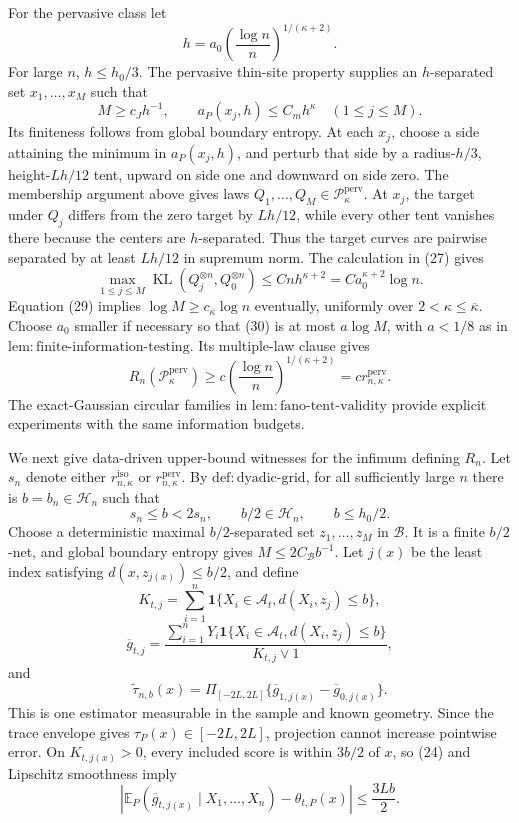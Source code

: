 For the pervasive class let
\[
 h=a_0\left(\frac{\log n}{n}\right)^{1/(\kappa+2)}.
\]
For large \(n\), \(h\le h_0/3\).  The pervasive thin-site property
supplies an \(h\)-separated set \(x_1,\ldots,x_M\) such that
\[
 M\ge c_Jh^{-1},
 \qquad a_P(x_j,h)\le C_mh^{\kappa}\quad(1\le j\le M). \tag{29}
\]
Its finiteness follows from global boundary entropy.  At each \(x_j\),
choose a side attaining the minimum in \(a_P(x_j,h)\), and perturb that
side by a radius-\(h/3\), height-\(Lh/12\) tent, upward on side one and
downward on side zero.  The membership argument above gives laws
\(Q_1,\ldots,Q_M\in\mathcal P_{\kappa}^{\mathrm{perv}}\).  At \(x_j\),
the target under \(Q_j\) differs from the zero target by \(Lh/12\), while
every other tent vanishes there because the centers are
\(h\)-separated.  Thus the target curves are pairwise separated by at
least \(Lh/12\) in supremum norm.  The calculation in (27) gives
\[
 \max_{1\le j\le M}
 \operatorname{KL}(Q_j^{\otimes n},Q_0^{\otimes n})
 \le Cnh^{\kappa+2}
 =Ca_0^{\kappa+2}\log n. \tag{30}
\]
Equation (29) implies \(\log M\ge c_{\overline\kappa}\log n\)
eventually, uniformly over \(2<\kappa\le\overline\kappa\).  Choose
\(a_0\) smaller if necessary so that (30) is at most \(a\log M\), with
\(a<1/8\) as in
\(\mathrm{lem:finite\text{-}information\text{-}testing}\).  Its
multiple-law clause gives
\[
 R_n(\mathcal P_{\kappa}^{\mathrm{perv}})
 \ge c\left(\frac{\log n}{n}\right)^{1/(\kappa+2)}
 =c r_{n,\kappa}^{\mathrm{perv}}. \tag{31}
\]
The exact-Gaussian circular families in
\(\mathrm{lem:fano\text{-}tent\text{-}validity}\) provide explicit
experiments with the same information budgets.

We next give data-driven upper-bound witnesses for the infimum defining
\(R_n\).  Let \(s_n\) denote either \(r_{n,\kappa}^{\mathrm{iso}}\) or
\(r_{n,\kappa}^{\mathrm{perv}}\).  By
\(\mathrm{def:dyadic\text{-}grid}\), for all sufficiently large \(n\)
there is \(b=b_n\in\mathcal H_n\) such that
\[
 s_n\le b<2s_n,
 \qquad b/2\in\mathcal H_n,
 \qquad b\le h_0/2. \tag{32}
\]
Choose a deterministic maximal \(b/2\)-separated set
\(z_1,\ldots,z_M\) in \(\mathcal B\).  It is a finite \(b/2\)-net, and
global boundary entropy gives \(M\le2C_{\mathcal B}b^{-1}\).  Let
\(j(x)\) be the least index satisfying \(d(x,z_{j(x)})\le b/2\), and
define
\[
 K_{t,j}=\sum_{i=1}^n\mathbf1\{X_i\in\mathcal A_t,
 d(X_i,z_j)\le b\},
\]
\[
 \overline g_{t,j}
 =\frac{\sum_{i=1}^nY_i\mathbf1\{X_i\in\mathcal A_t,
 d(X_i,z_j)\le b\}}{K_{t,j}\vee1},
\]
and
\[
 \widetilde\tau_{n,b}(x)
 =\Pi_{[-2L,2L]}\{\overline g_{1,j(x)}-
 \overline g_{0,j(x)}\}. \tag{33}
\]
This is one estimator measurable in the sample and known geometry.  Since
the trace envelope gives \(\tau_P(x)\in[-2L,2L]\), projection cannot
increase pointwise error.  On \(K_{t,j(x)}>0\), every included score is
within \(3b/2\) of \(x\), so (24) and Lipschitz smoothness imply
\[
 \left|\mathbb E_P(\overline g_{t,j(x)}\mid X_1,\ldots,X_n)
       -\theta_{t,P}(x)\right|
 \le\frac{3Lb}{2}. \tag{34}
\]

